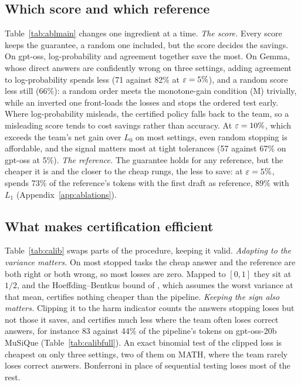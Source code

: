 \subsection{Which score and which reference}
\label{sec:ablations}



Table~\ref{tab:ablmain} changes one ingredient at a time. \emph{The score.} Every score keeps the
guarantee, a random one included, but the score decides the savings. On gpt-oss, log-probability and
agreement together save the most. On Gemma, whose direct answers are confidently wrong on three settings,
adding agreement to log-probability spends less (71 against 82\% at $\varepsilon = 5\%$), and a random score less
still (66\%): a random order meets the monotone-gain condition (M) trivially, while an inverted one front-loads the losses and stops the ordered test early. Where log-probability misleads, the certified policy falls back to the team, so a misleading
score tends to cost savings rather than accuracy. At $\varepsilon = 10\%$, which exceeds the team's net gain over $L_0$ on most
settings, even random stopping is affordable, and the signal matters most at tight tolerances (57 against 67\%
on gpt-oss at 5\%). \emph{The
reference.} The guarantee holds for any reference, but the cheaper it is and the closer to the cheap
rungs, the less to save: at $\varepsilon = 5\%$, \climb{} spends 73\% of the reference's tokens with the first draft as reference, 89\% with $L_1$ (Appendix~\ref{app:ablations}).

\subsection{What makes certification efficient}
\label{sec:testchoice}



Table~\ref{tab:calib} swaps parts of the procedure, keeping it valid. \emph{Adapting to the variance matters.} On most stopped tasks the cheap answer and the reference are both right or both wrong, so most losses are zero. Mapped to $[0, 1]$
they sit at $1/2$, and the Hoeffding--Bentkus bound
of \citet{wynn2026corrupted}, which assumes the worst variance at that mean, certifies nothing cheaper than the pipeline.
\emph{Keeping the sign also matters.} Clipping it to the harm indicator counts the answers stopping loses but
not those it saves, and certifies much less where the team often loses correct answers, for instance 83
against 44\% of the pipeline's tokens on gpt-oss-20b MuSiQue (Table~\ref{tab:calibfull}). An exact binomial
test of the clipped loss is cheapest on only three settings, two of them on MATH, where the team rarely loses
correct answers. Bonferroni in place of sequential testing loses most of the rest.
